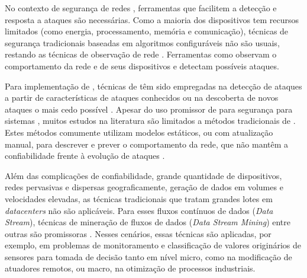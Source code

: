 No contexto de segurança de redes \iot, ferramentas que facilitem a detecção e
resposta a ataques são necessárias.
Como a maioria dos dispositivos \iot tem recursos limitados (como energia,
processamento, memória e comunicação), técnicas de segurança tradicionais
baseadas em algoritmos configuráveis não são usuais, restando as
técnicas de observação de rede \cite{Zhou2017}.
Ferramentas como \nids observam o comportamento da rede e de seus dispositivos
e detectam possíveis ataques.
% 

Para implementação de \nids, técnicas de \ml têm sido empregadas na detecção de
ataques a partir de características de ataques conhecidos ou na
descoberta de novos ataques o mais cedo possível
\cite{buczak2016survey,mitchell2014survey}.
Apesar do uso promissor de \ml para segurança para sistemas \iot, muitos estudos
na literatura \cite{buczak2016survey,mitchell2014survey,Tahsien2020} são
limitados a métodos tradicionais de \ml.
Estes métodos comumente utilizam modelos estáticos, ou com atualização manual,
para descrever e prever o comportamento da rede, que não mantêm a confiabilidade
frente à evolução de ataques \cite{Viegas2019,AndreoniLopez2019}.


Além das complicações de confiabilidade, grande quantidade de dispositivos,
redes pervasivas e dispersas geograficamente,
geração de dados em volumes e velocidades elevadas, as técnicas
tradicionais que tratam grandes lotes em \emph{datacenters} não são aplicáveis.
Para esses fluxos contínuos de dados (\emph{Data Stream}), técnicas de
mineração de fluxos de dados (\emph{Data Stream Mining}) entre outras são
promissoras \cite{AriyaluranHabeeb2019,Faria2016ndds,Akbar2017}.
% 
Nesses cenários, essas técnicas são aplicadas, por exemplo, em problemas de
monitoramento e classificação de valores originários de sensores para tomada de
decisão tanto em nível micro, como na modificação de atuadores remotos, ou
macro, na otimização de processos industriais.
% 

